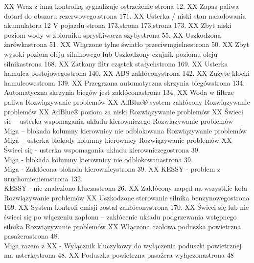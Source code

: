 XX	Wraz z inną kontrolką sygnalizuje ostrzeżenie \guillemotright strona 12.
XX	Zapas paliwa dotarł do obszaru rezerwowego.\guillemotright strona 171.
XX	Usterka / niski stan naładowania akumulatora 12 V pojazdu \guillemotright strona 173,\guillemotright strona 173,\guillemotright strona
173.
XX	Zbyt niski poziom wody w zbiorniku spryskiwacza szyby\guillemotright strona 55.
XX	Uszkodzona żarówka\guillemotright strona 51.
XX	Włączone tylne światło przeciwmgielne\guillemotright strona 50.
XX	Zbyt wysoki poziom oleju silnikowego lub Uszkodzony czujnik poziomu oleju silnika\guillemotright strona 168.
XX	Zatkany filtr cząstek stałych\guillemotright strona 169.
XX	Usterka hamulca postojowego\guillemotright strona 140.
XX	ABS zakłócony\guillemotright strona 142.
XX	Zużyte klocki hamulcowe\guillemotright strona 139.
XX	Przegrzana automatyczna skrzynia biegów\guillemotright strona 134. \\ Automatyczna skrzynia biegów jest zakłócona\guillemotright strona 134.
XX	Woda w filtrze paliwa \guillemotright Rozwiązywanie problemów
XX	AdBlue® system zakłócony \guillemotright Rozwiązywanie problemów
XX	AdBlue® poziom za niski \guillemotright Rozwiązywanie problemów
XX	Świeci się – usterka wspomagania układu kierowniczego \guillemotright Rozwiązywanie problemów \\ Miga – blokada kolumny kierownicy nie odblokowana \guillemotright Rozwiązywanie problemów \\ Miga – usterka blokady kolumny kierownicy \guillemotright Rozwiązywanie problemów
XX	Świeci się - usterka wspomagania układu kierowniczego\guillemotright strona 39. \\ Miga - blokada kolumny kierownicy nie odblokowana\guillemotright strona 39. \\ Miga - Zakłócona blokada kierownicy\guillemotright strona 39.
XX	KESSY - problem z uruchomieniem\guillemotright strona 132. \\ KESSY - nie znaleziono klucza\guillemotright strona 26.
XX	Zakłócony napęd na wszystkie koła \guillemotright Rozwiązywanie problemów
XX	Uszkodzone sterowanie silnika benzynowego\guillemotright strona 169.
XX	System kontroli emisji został zakłócony\guillemotright strona 170.
XX	Świeci się lub nie świeci się po włączeniu zapłonu – zakłócenie układu podgrzewania wstępnego silnika \guillemotright Rozwiązywanie problemów
XX	Włączona czołowa poduszka powietrzna pasażera\guillemotright strona 48. \\ Miga razem z XX - Wyłącznik kluczykowy do wyłączenia poduszki powietrznej ma usterkę\guillemotright strona 48.
XX	Poduszka powietrzna pasażera wyłączona\guillemotright strona 48

